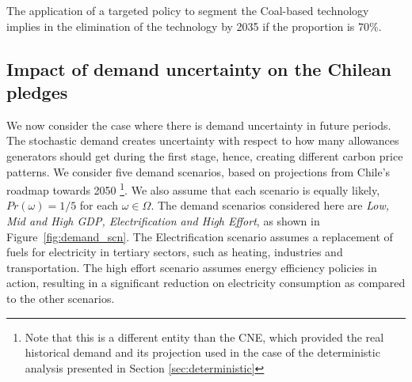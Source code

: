 \documentclass[11pt, letterpaper]{article}
\begin{document}
The application of a targeted policy to segment the Coal-based technology implies in the elimination of the technology by 2035 if the proportion is 70\%. 


\subsection{Impact of demand uncertainty on the Chilean pledges}\label{sec:scenarios}
We now consider the case where there is demand uncertainty in future periods. The stochastic demand creates uncertainty with respect to how many allowances generators should get during the first stage, hence, creating different carbon price patterns. We consider five demand scenarios, based on projections from Chile's roadmap towards 2050
\cite{HojadeRuta}\footnote{Note that this is a different entity than the CNE, which provided the real historical demand and its projection used in the case of the deterministic analysis presented in Section \ref{sec:deterministic}}. We also assume that each scenario is equally likely, $Pr(\omega)=1/5$ for each $\omega\in\Omega$. The demand scenarios considered here are \textit{Low, Mid and High GDP, Electrification and High Effort}, as shown in Figure~\ref{fig:demand_scn}. The Electrification scenario assumes a replacement of fuels for electricity in tertiary sectors, such as heating, industries and transportation. The high effort scenario assumes energy efficiency policies in action, resulting in a significant reduction on electricity consumption as compared to the other scenarios. 
\end{document}
